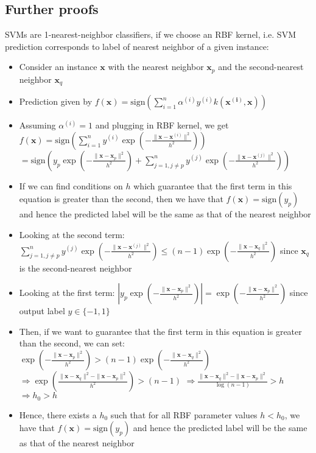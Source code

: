 \subsection*{Further proofs}
SVMs are 1-nearest-neighbor classifiers, if we choose an RBF kernel, i.e. SVM prediction corresponds to label of nearest neighbor of a given instance:
\begin{itemize}
    \item Consider an instance $\boldsymbol{x}$ with the nearest neighbor $\boldsymbol{x}_p$ and the second-nearest neighbor $\boldsymbol{x}_q$
    \item Prediction given by $f(\boldsymbol{x}) = \textrm{sign}( \sum_{i=1}^n \alpha^{(i)} y^{(i)} k(\boldsymbol{x^{(i)}}, \boldsymbol{x}))$
    \item Assuming $\alpha^{(i)} = 1$ and plugging in RBF kernel, we get $
    f(\boldsymbol{x}) = \text{sign} \left( \sum_{i=1}^n y^{(i)} \exp \left( -\frac{\|\boldsymbol{x} - \boldsymbol{x}^{(i)}\|^2}{h^2} \right) \right)
    $
    $
    = \text{sign} \left( y_p \exp \left( -\frac{\|\boldsymbol{x} - \boldsymbol{x}_p\|^2}{h^2} \right) + \sum_{j=1, j \neq p}^n y^{(j)} \exp \left( -\frac{\|\boldsymbol{x} - \boldsymbol{x}^{(j)}\|^2}{h^2} \right) \right)
    $
    \item If we can find conditions on $h$ which guarantee that the first term in this equation is greater than the second, then we have that $f(\boldsymbol{x}) = \text{sign}(y_p)$ and hence the predicted label will be the same as that of the nearest neighbor
    \item Looking at the second term:
    $
    \sum_{j=1, j \neq p}^n y^{(j)} \exp \left( -\frac{\|\boldsymbol{x} - \boldsymbol{x}^{(j)}\|^2}{h^2} \right) \leq (n-1) \exp \left( -\frac{\|\boldsymbol{x} - \boldsymbol{x}_q\|^2}{h^2} \right)
    $ since $\boldsymbol{x}_q$ is the second-nearest neighbor
    \item Looking at the first term:
    $
    \left| y_p \exp \left( -\frac{\|\boldsymbol{x} - \boldsymbol{x}_p\|^2}{h^2} \right) \right| = \exp \left( -\frac{\|\boldsymbol{x} - \boldsymbol{x}_p\|^2}{h^2} \right)
    $ since output label $y \in \{-1,1\}$
    \item Then, if we want to guarantee that the first term in this equation is greater than the second, we can set:
    $
    \exp \left( -\frac{\|\boldsymbol{x} - \boldsymbol{x}_p\|^2}{h^2} \right) > (n-1) \exp \left( -\frac{\|\boldsymbol{x} - \boldsymbol{x}_q\|^2}{h^2} \right)
    $
    $
    \Rightarrow \exp \left( \frac{\|\boldsymbol{x} - \boldsymbol{x}_q\|^2 - \|\boldsymbol{x} - \boldsymbol{x}_p\|^2}{h^2} \right) > (n-1)
    $
    $
    \Rightarrow \frac{\|\boldsymbol{x} - \boldsymbol{x}_q\|^2 - \|\boldsymbol{x} - \boldsymbol{x}_p\|^2}{\log(n-1)} > h
    $
    $
    \Rightarrow h_0 > h
    $
    \item Hence, there exists a $h_0$ such that for all RBF parameter values $h < h_0$, we have that $f(\boldsymbol{x}) = \text{sign}(y_p)$ and hence the predicted label will be the same as that of the nearest neighbor
\end{itemize}
